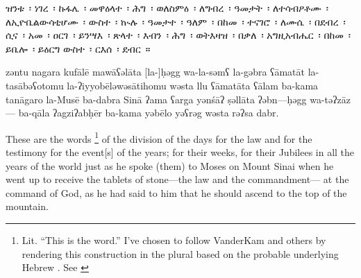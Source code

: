 
\begin{ethiopictext}
        ዝንቱ~፡ ነገረ~፡ ኩፋሌ~፡
        መዋዕላተ~፡ ሕግ~፡ ወለስምዕ~፡
        ለግብረ~፡ ዓመታት~፡ ለተሳብዖቶሙ~፡ 
        ለኢዮቤልውሳቲሆሙ~፡ ውስተ~፡ ኲሉ~፡ ዓመታተ~፡ ዓለም~፡
        በከመ~፡ ተናገሮ~፡ ለሙሴ~፡ በደብረ~፡ ሲና~፡
        አመ~፡ ዐርገ~፡ ይንሣእ~፡ ጽላተ~፡ እብን~፡ ሕግ~፡ ወትእዛዝ~፡ 
        በቃለ~፡ አግዚአብሔር~፡ በከመ~፡ ይቤሎ~፡ ይዕርግ ውስተ~፡ ርእሰ~፡ ደብር~።
\end{ethiopictext}

\begin{transliteration}
        zəntu nagara kufālē
        mawāʕəlāta [la-]ḥəgg wa-la-səmʕ
        la-gəbra ʕāmatāt la-tasābəʕotomu
        la-ʔiyyobēləwəsātihomu wəsta llu ʕāmatāta ʕālam
        ba-kama tanāgaro la-Musē ba-dabra Sinā
        ʔama ʕarga yənśāʔ ṣəllāta ʔəbn---ḥəgg wa-təʔzāz---%
        ba-qāla ʔagziʔabḥēr ba-kama yəbēlo yəʕrəg wəsta rəʔsa dabr.
\end{transliteration}

\begin{translation}
        These are the words%
        \footnote{Lit. ``This is the word.'' I've chosen to follow VanderKam and others by rendering this construction in the plural based on the probable underlying Hebrew . See \cite[125]{vanderkam2018}}
        of the division 
        of the days for the law and for the testimony
        for the event[s] of the years; for their weeks,
        for their Jubilees in all the years of the world
        just as he spoke (them) to Moses on Mount Sinai 
        when he went up to receive the tablets of stone---the law and the commandment---%
        at the command of God, as he had said to him 
        that he should ascend to the top of the mountain.
\end{translation}